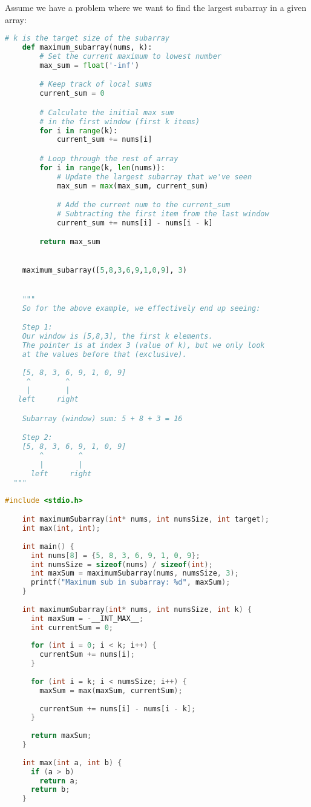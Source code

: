 \documentclass[12pt, letterpaper]{report}
\begin{document}
Assume we have a problem where we want to find the largest subarray in a given array:
\begin{lstlisting}[language=Python,caption={Sliding Window In Python}]
    # k is the target size of the subarray
    def maximum_subarray(nums, k):
        # Set the current maximum to lowest number
        max_sum = float('-inf')

        # Keep track of local sums
        current_sum = 0

        # Calculate the initial max sum
        # in the first window (first k items)
        for i in range(k):
            current_sum += nums[i]

        # Loop through the rest of array
        for i in range(k, len(nums)):
            # Update the largest subarray that we've seen
            max_sum = max(max_sum, current_sum)

            # Add the current num to the current_sum
            # Subtracting the first item from the last window
            current_sum += nums[i] - nums[i - k]

        return max_sum
        

    maximum_subarray([5,8,3,6,9,1,0,9], 3)


    """
    So for the above example, we effectively end up seeing:

    Step 1:
    Our window is [5,8,3], the first k elements.
    The pointer is at index 3 (value of k), but we only look
    at the values before that (exclusive).
    
    [5, 8, 3, 6, 9, 1, 0, 9]
     ^        ^
     |        |
   left     right

    Subarray (window) sum: 5 + 8 + 3 = 16

    Step 2:
    [5, 8, 3, 6, 9, 1, 0, 9]
        ^        ^
        |        |
      left     right
  """
\end{lstlisting}

\pagebreak
\begin{lstlisting}[language=C,caption={Sliding Window In C}]
    #include <stdio.h>

    int maximumSubarray(int* nums, int numsSize, int target);
    int max(int, int);
    
    int main() {
      int nums[8] = {5, 8, 3, 6, 9, 1, 0, 9};
      int numsSize = sizeof(nums) / sizeof(int);
      int maxSum = maximumSubarray(nums, numsSize, 3);
      printf("Maximum sub in subarray: %d", maxSum);
    }
    
    int maximumSubarray(int* nums, int numsSize, int k) {
      int maxSum = -__INT_MAX__;
      int currentSum = 0;
    
      for (int i = 0; i < k; i++) {
        currentSum += nums[i];
      }
    
      for (int i = k; i < numsSize; i++) {
        maxSum = max(maxSum, currentSum);
    
        currentSum += nums[i] - nums[i - k];
      }
    
      return maxSum;
    }
    
    int max(int a, int b) {
      if (a > b)
        return a;
      return b;
    }
\end{lstlisting}
\end{document}
